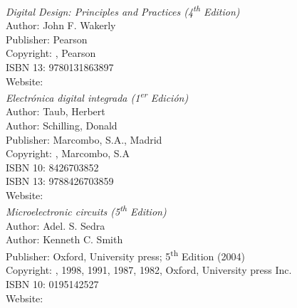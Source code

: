 
\begin{thebibliography}{9}




\emph{Digital Design: Principles and Practices (4\textsuperscript{th} Edition)}\\
Author: John F. Wakerly \\
Publisher: Pearson \\
Copyright: \textcopyright {}, Pearson\\
ISBN 13: 9780131863897\\
Website: \\




\emph{Electrónica digital integrada (1\textsuperscript{er} Edición)}\\
Author: Taub, Herbert \\
Author: Schilling, Donald \\
Publisher: Marcombo, S.A., Madrid \\
Copyright: \textcopyright {}, Marcombo, S.A\\
ISBN 10: 8426703852\\
ISBN 13: 9788426703859\\
Website: \\




\emph{Microelectronic circuits (5\textsuperscript{th} Edition)}\\
Author: Adel. S. Sedra\\
Author: Kenneth C. Smith\\
Publisher: Oxford, University press; 5\textsuperscript{th} Edition (2004)\\
Copyright: \textcopyright {}, 1998, 1991, 1987, 1982, Oxford, University press Inc.\\
ISBN 10: 0195142527\\
Website: \\



\end{thebibliography}